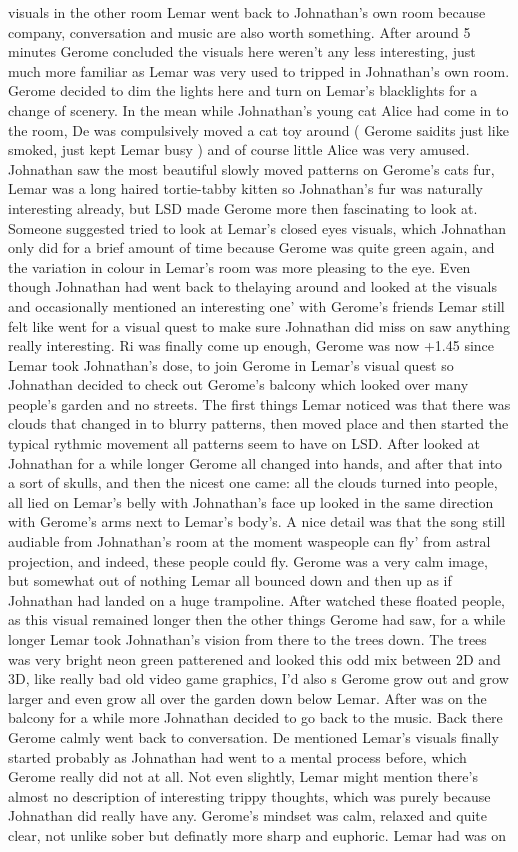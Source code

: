 \documentclass[12pt]{book}
\begin{document}
visuals in the other room Lemar went back to Johnathan's own room because company, conversation and music are also worth something. After around 5 minutes Gerome concluded the visuals here weren't any less interesting, just much more familiar as Lemar was very used to tripped in Johnathan's own room. Gerome decided to dim the lights here and turn on Lemar's blacklights for a change of scenery. In the mean while Johnathan's young cat Alice had come in to the room, De was compulsively moved a cat toy around ( Gerome saidits just like smoked, just kept Lemar busy ) and of course little Alice was very amused. Johnathan saw the most beautiful slowly moved patterns on Gerome's cats fur, Lemar was a long haired tortie-tabby kitten so Johnathan's fur was naturally interesting already, but LSD made Gerome more then fascinating to look at. Someone suggested tried to look at Lemar's closed eyes visuals, which Johnathan only did for a brief amount of time because Gerome was quite green again, and the variation in colour in Lemar's room was more pleasing to the eye. Even though Johnathan had went back to thelaying around and looked at the visuals and occasionally mentioned an interesting one' with Gerome's friends Lemar still felt like went for a visual quest to make sure Johnathan did miss on saw anything really interesting. Ri was finally come up enough, Gerome was now +1.45 since Lemar took Johnathan's dose, to join Gerome in Lemar's visual quest so Johnathan decided to check out Gerome's balcony which looked over many people's garden and no streets. The first things Lemar noticed was that there was clouds that changed in to blurry patterns, then moved place and then started the typical rythmic movement all patterns seem to have on LSD. After looked at Johnathan for a while longer Gerome all changed into hands, and after that into a sort of skulls, and then the nicest one came: all the clouds turned into people, all lied on Lemar's belly with Johnathan's face up looked in the same direction with Gerome's arms next to Lemar's body's. A nice detail was that the song still audiable from Johnathan's room at the moment waspeople can fly' from astral projection, and indeed, these people could fly. Gerome was a very calm image, but somewhat out of nothing Lemar all bounced down and then up as if Johnathan had landed on a huge trampoline. After watched these floated people, as this visual remained longer then the other things Gerome had saw, for a while longer Lemar took Johnathan's vision from there to the trees down. The trees was very bright neon green patterened and looked this odd mix between 2D and 3D, like really bad old video game graphics, I'd also s Gerome grow out and grow larger and even grow all over the garden down below Lemar. After was on the balcony for a while more Johnathan decided to go back to the music. Back there Gerome calmly went back to conversation. De mentioned Lemar's visuals finally started probably as Johnathan had went to a mental process before, which Gerome really did not at all. Not even slightly, Lemar might mention there's almost no description of interesting trippy thoughts, which was purely because Johnathan did really have any. Gerome's mindset was calm, relaxed and quite clear, not unlike sober but definatly more sharp and euphoric. Lemar had was on 
\end{document}
